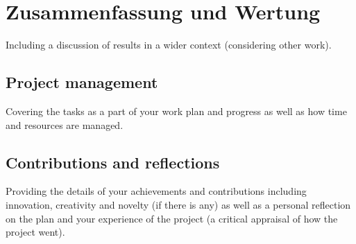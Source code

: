 \chapter{Zusammenfassung und Wertung}\label{ch:summary}

Including a discussion of results in a wider context (considering other work).



\section{Project management}

Covering the tasks as a part of your work plan and progress as well as how time and resources are managed.


\section{Contributions and reflections}

Providing the details of your achievements and contributions including innovation, creativity and novelty (if there is any) as well as a personal reflection on the plan and your experience of the project (a critical appraisal of how the project went).